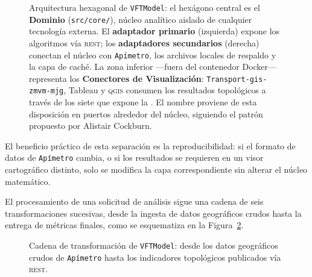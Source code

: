\begin{figure}[H]
    \centering
    \resizebox{\linewidth}{!}{%
        }%
    \caption[Arquitectura hexagonal de \texttt{VFTModel}]{Arquitectura hexagonal de
    \texttt{VFTModel}: el hexágono central es el \textbf{Dominio} (\texttt{src/core/}),
    núcleo analítico aislado de cualquier tecnología externa. El
    \textbf{adaptador primario} (izquierda) expone los algoritmos vía \api{}
    \textsc{rest}; los \textbf{adaptadores secundarios} (derecha) conectan el
    núcleo con \texttt{Apímetro}, los archivos locales de respaldo y la capa de caché. La
    zona inferior —fuera del contenedor Docker— representa los
    \textbf{Conectores de Visualización}: \texttt{Transport-gis-zmvm-mjg}, Tableau y
    \textsc{qgis} consumen los resultados topológicos a través de los siete
     que expone la \api{}. El nombre 
    proviene de esta disposición en puertos alrededor del núcleo, siguiendo el
    patrón  propuesto por Alistair Cockburn.}
    \label{fig:vft-arquitectura}
\end{figure}

El beneficio práctico de esta separación es la reproducibilidad: si el formato
de datos de \texttt{Apímetro} cambia, o si los resultados se requieren en un visor
cartográfico distinto, solo se modifica la capa correspondiente sin alterar el
núcleo matemático.

\label{subsec:vft-flujo}

El procesamiento de una solicitud de análisis sigue una cadena de seis
transformaciones sucesivas, desde la ingesta de datos geográficos crudos hasta
la entrega de métricas finales, como se esquematiza en la
Figura~\ref{fig:vft-flujo}.

\begin{figure}[H]
    \centering
    \resizebox{\linewidth}{!}{%
    }%
    \caption[Flujo de procesamiento de \texttt{VFTModel}]{Cadena de transformación de
    \texttt{VFTModel}: desde los datos geográficos crudos de \texttt{Apímetro} hasta los
    indicadores topológicos publicados vía \api{} \textsc{rest}.}
    \label{fig:vft-flujo}
\end{figure}
